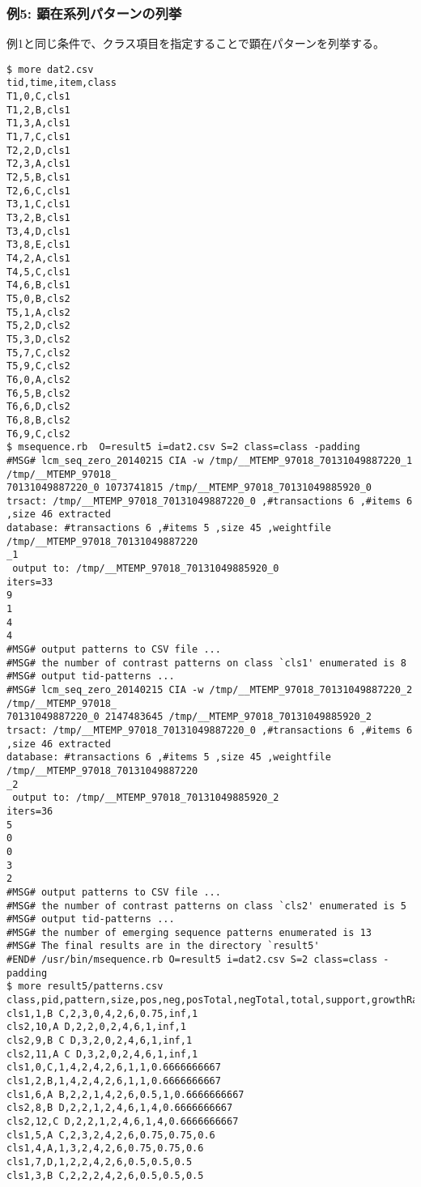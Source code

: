 \subsubsection*{例5: 顕在系列パターンの列挙\label{ex:ep1}}

例1と同じ条件で、クラス項目を指定することで顕在パターンを列挙する。


\begin{Verbatim}[baselinestretch=0.7,frame=single]
$ more dat2.csv
tid,time,item,class
T1,0,C,cls1
T1,2,B,cls1
T1,3,A,cls1
T1,7,C,cls1
T2,2,D,cls1
T2,3,A,cls1
T2,5,B,cls1
T2,6,C,cls1
T3,1,C,cls1
T3,2,B,cls1
T3,4,D,cls1
T3,8,E,cls1
T4,2,A,cls1
T4,5,C,cls1
T4,6,B,cls1
T5,0,B,cls2
T5,1,A,cls2
T5,2,D,cls2
T5,3,D,cls2
T5,7,C,cls2
T5,9,C,cls2
T6,0,A,cls2
T6,5,B,cls2
T6,6,D,cls2
T6,8,B,cls2
T6,9,C,cls2
$ msequence.rb  O=result5 i=dat2.csv S=2 class=class -padding
#MSG# lcm_seq_zero_20140215 CIA -w /tmp/__MTEMP_97018_70131049887220_1 /tmp/__MTEMP_97018_
70131049887220_0 1073741815 /tmp/__MTEMP_97018_70131049885920_0
trsact: /tmp/__MTEMP_97018_70131049887220_0 ,#transactions 6 ,#items 6 ,size 46 extracted 
database: #transactions 6 ,#items 5 ,size 45 ,weightfile /tmp/__MTEMP_97018_70131049887220
_1
 output to: /tmp/__MTEMP_97018_70131049885920_0
iters=33
9
1
4
4
#MSG# output patterns to CSV file ...
#MSG# the number of contrast patterns on class `cls1' enumerated is 8
#MSG# output tid-patterns ...
#MSG# lcm_seq_zero_20140215 CIA -w /tmp/__MTEMP_97018_70131049887220_2 /tmp/__MTEMP_97018_
70131049887220_0 2147483645 /tmp/__MTEMP_97018_70131049885920_2
trsact: /tmp/__MTEMP_97018_70131049887220_0 ,#transactions 6 ,#items 6 ,size 46 extracted 
database: #transactions 6 ,#items 5 ,size 45 ,weightfile /tmp/__MTEMP_97018_70131049887220
_2
 output to: /tmp/__MTEMP_97018_70131049885920_2
iters=36
5
0
0
3
2
#MSG# output patterns to CSV file ...
#MSG# the number of contrast patterns on class `cls2' enumerated is 5
#MSG# output tid-patterns ...
#MSG# the number of emerging sequence patterns enumerated is 13
#MSG# The final results are in the directory `result5'
#END# /usr/bin/msequence.rb O=result5 i=dat2.csv S=2 class=class -padding
$ more result5/patterns.csv
class,pid,pattern,size,pos,neg,posTotal,negTotal,total,support,growthRate,postProb
cls1,1,B C,2,3,0,4,2,6,0.75,inf,1
cls2,10,A D,2,2,0,2,4,6,1,inf,1
cls2,9,B C D,3,2,0,2,4,6,1,inf,1
cls2,11,A C D,3,2,0,2,4,6,1,inf,1
cls1,0,C,1,4,2,4,2,6,1,1,0.6666666667
cls1,2,B,1,4,2,4,2,6,1,1,0.6666666667
cls1,6,A B,2,2,1,4,2,6,0.5,1,0.6666666667
cls2,8,B D,2,2,1,2,4,6,1,4,0.6666666667
cls2,12,C D,2,2,1,2,4,6,1,4,0.6666666667
cls1,5,A C,2,3,2,4,2,6,0.75,0.75,0.6
cls1,4,A,1,3,2,4,2,6,0.75,0.75,0.6
cls1,7,D,1,2,2,4,2,6,0.5,0.5,0.5
cls1,3,B C,2,2,2,4,2,6,0.5,0.5,0.5
\end{Verbatim}
